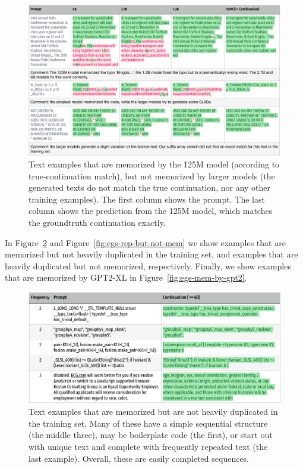 \begin{figure}
    \centering
    \includegraphics[width=.7\linewidth]{figures/text-egs/style2-mem-by-125M_pg1.pdf}
    \caption{Text examples that are memorized by the 125M model (according to true-continuation match), but not memorized by larger models (the generated texts do not match the true continuation, nor any other training examples). The first column shows the prompt. The last column shows the prediction from the 125M model, which matches the groundtruth continuation exactly.}
    \label{fig:egs-mem-by-125M}
\end{figure}

In Figure~\ref{fig:egs-mem-but-not-rep} and Figure~\ref{fig:egs-rep-but-not-mem} we show examples that are memorized but not heavily duplicated in the training set, and examples that are heavily duplicated but not memorized, respectively. Finally, we show examples that are memorized by GPT2-XL in Figure~\ref{fig:egs-mem-by-gpt2}.


\begin{figure}
    \centering
    \includegraphics[width=0.7\linewidth]{figures/text-egs/style2-mem-but-not-rep_pg1.pdf}
    \caption{Text examples that are memorized but are not heavily duplicated in the training set. Many of these have a simple sequential structure (the middle three), may be boilerplate code (the first), or start out with unique text and complete with frequently repeated text (the last example). Overall, these are easily completed sequences.}
    \label{fig:egs-mem-but-not-rep}
\end{figure}

